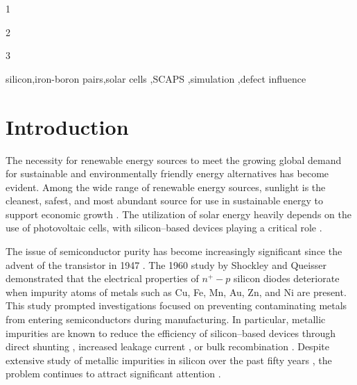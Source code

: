 \documentclass[a4paper,fleqn]{cas-sc}
\begin{document}
\begin{highlights}
\item 1
\item 2
\item 3
\end{highlights}

\begin{keywords}
 silicon\sep iron-boron pairs\sep solar cells \sep SCAPS \sep simulation \sep defect influence
\end{keywords}

\maketitle

\section{Introduction}%
\par
The necessity for renewable energy sources to meet the growing global demand for sustainable and environmentally friendly energy alternatives has become evident.
Among the wide range of renewable energy sources, sunlight is the cleanest, safest,
and most abundant source for use in sustainable energy to support economic growth \cite{PratapSingh2019}.
The utilization of solar energy heavily depends on the use of photovoltaic cells, with silicon--based devices playing a critical role \cite{Basnet2024,Wang2024}.


The issue of semiconductor purity has become increasingly significant since the advent of the transistor in 1947 \cite{Claers2018}.
The 1960 study by Shockley and Queisser \cite{Goetzberger1960} demonstrated that
the electrical properties of $n^{+}-p$ silicon diodes deteriorate when impurity atoms of metals such as Cu, Fe, Mn, Au, Zn, and Ni are present.
This study prompted investigations focused on preventing contaminating metals from entering semiconductors during manufacturing.
In particular, metallic impurities are known to reduce the efficiency of
silicon--based devices through direct shunting \cite{Rsh:Breitenstein},
increased leakage current \cite{Lee1980},
or bulk recombination \cite{Istratov2000}.
Despite extensive study of metallic impurities in silicon over the past fifty years \cite{Claers2018,Pearce1977},
the problem continues to attract significant attention \cite{Hajjiah2020,Le2024,Maoudj2021,OlikhPSSA,LaineIEEEPV2016}.
\end{document}

